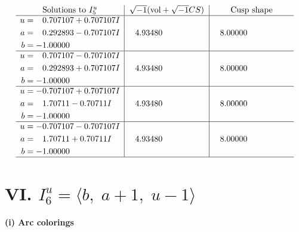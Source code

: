 \documentclass[1p]{elsarticle_modified}
\theoremstyle{definition}
\newcommand{\I}{\sqrt{-1}}
\begin{document}
$$\begin{array}{c|c|c}  
\text{Solutions to }I^u_{5}& \I (\text{vol} + \sqrt{-1}CS) & \text{Cusp shape}\\
 \hline 
\begin{aligned}
u &= \phantom{-}0.707107 + 0.707107 I \\
a &= \phantom{-}0.292893 - 0.707107 I \\
b &= -1.00000\phantom{ +0.000000I}\end{aligned}
 & \phantom{-}4.93480\phantom{ +0.000000I} & \phantom{-}8.00000\phantom{ +0.000000I} \\ \hline\begin{aligned}
u &= \phantom{-}0.707107 - 0.707107 I \\
a &= \phantom{-}0.292893 + 0.707107 I \\
b &= -1.00000\phantom{ +0.000000I}\end{aligned}
 & \phantom{-}4.93480\phantom{ +0.000000I} & \phantom{-}8.00000\phantom{ +0.000000I} \\ \hline\begin{aligned}
u &= -0.707107 + 0.707107 I \\
a &= \phantom{-}1.70711 - 0.70711 I \\
b &= -1.00000\phantom{ +0.000000I}\end{aligned}
 & \phantom{-}4.93480\phantom{ +0.000000I} & \phantom{-}8.00000\phantom{ +0.000000I} \\ \hline\begin{aligned}
u &= -0.707107 - 0.707107 I \\
a &= \phantom{-}1.70711 + 0.70711 I \\
b &= -1.00000\phantom{ +0.000000I}\end{aligned}
 & \phantom{-}4.93480\phantom{ +0.000000I} & \phantom{-}8.00000\phantom{ +0.000000I}\\
 \hline 
 \end{array}$$\newpage\newpage\renewcommand{\arraystretch}{1}
\centering \section*{VI. $I^u_{6}= \langle b,\;a+1,\;u-1 \rangle$}
\flushleft \textbf{(i) Arc colorings}\\
\end{document}
